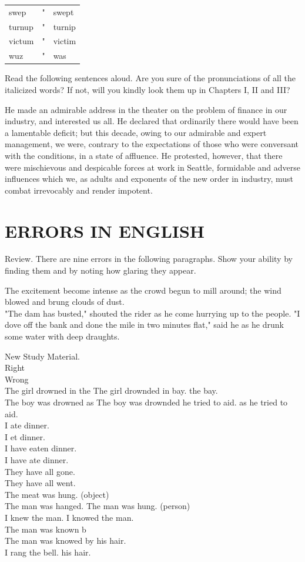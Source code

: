 \documentclass[10pt]{article}
\begin{document}
\begin{center}
\begin{tabular}{lll}
swep & " & swept \\
turnup & " & turnip \\
victum & " & victim \\
wuz & " & was \\
\end{tabular}
\end{center}

Read the following sentences aloud. Are you sure of the pronunciations of all the italicized words? If not, will you kindly look them up in Chapters I, II and III?

He made an admirable address in the theater on the problem of finance in our industry, and interested us all. He declared that ordinarily there would have been a lamentable deficit; but this decade, owing to our admirable and expert management, we were, contrary to the expectations of those who were conversant with the conditions, in a state of affluence. He protested, however, that there were mischievous and despicable forces at work in Seattle, formidable and adverse influences which we, as adults and exponents of the new order in industry, must combat irrevocably and render impotent.

\section*{ERRORS IN ENGLISH}
Review. There are nine errors in the following paragraphs. Show your ability by finding them and by noting how glaring they appear.

The excitement become intense as the crowd begun to mill around; the wind blowed and brung clouds of dust.\\
"The dam has busted," shouted the rider as he come hurrying up to the people. "I dove off the bank and done the mile in two minutes flat," said he as he drunk some water with deep draughts.

New Study Material.\\
Right\\
Wrong\\
The girl drowned in the The girl drownded in bay. the bay.\\
The boy was drowned as The boy was drownded he tried to aid. as he tried to aid.\\
I ate dinner.\\
I et dinner.\\
I have eaten dinner.\\
I have ate dinner.\\
They have all gone.\\
They have all went.\\
The meat was hung. (object)\\
The man was hanged. The man was hung. (person)\\
I knew the man. I knowed the man.\\
The man was known b\\
The man was knowed by his hair.\\
I rang the bell. his hair.
\end{document}
